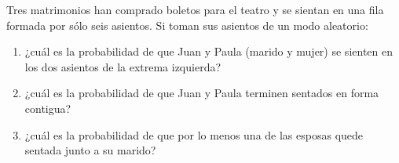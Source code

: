 \item Tres matrimonios han comprado boletos para el teatro y se sientan en una fila formada por sólo seis asientos. Si toman sus asientos de un modo aleatorio:
    \begin{enumerate}
        \item ¿cuál es la probabilidad de que Juan y Paula (marido y mujer) se sienten en los dos asientos de la extrema izquierda?
        \item ¿cuál es la probabilidad de que Juan y Paula terminen sentados en forma contigua?
        \item ¿cuál es la probabilidad de que por lo menos una de las esposas quede sentada junto a su marido?
    \end{enumerate}